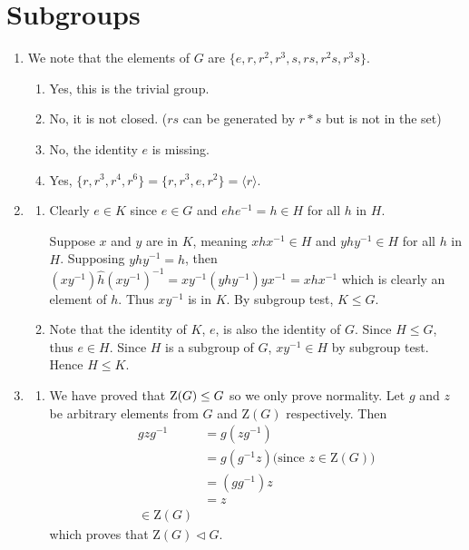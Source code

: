 \section{Subgroups}
\begin{enumerate}
    \item We note that the elements of $G$ are $\{e, r, r^2, r^3, s, rs, r^2s, r^3s\}$.
    \begin{enumerate}[label=(\alph*)]
        \item Yes, this is the trivial group.
        \item No, it is not closed. ($rs$ can be generated by $r \ast s$ but is not in the set)
        \item No, the identity $e$ is missing.
        \item Yes, $\{r, r^3, r^4, r^6\} = \{r, r^3, e, r^2\} = \langle r \rangle$.
    \end{enumerate}

    \item \begin{enumerate}[label=(\alph*)]
        \item Clearly $e \in K$ since $e \in G$ and $ehe^{-1} = h \in H$ for all $h$ in $H$.

        Suppose $x$ and $y$ are in $K$, meaning $xhx^{-1} \in H$ and $yhy^{-1} \in H$ for all $h$ in $H$. Supposing $yhy^{-1} = \hat{h}$, then $(xy^{-1})\hat{h}(xy^{-1})^{-1} = xy^{-1}\left(yhy^{-1}\right)yx^{-1} = xhx^{-1}$ which is clearly an element of $h$. Thus $xy^{-1}$ is in $K$. By subgroup test, $K \leq G$.

        \item Note that the identity of $K$, $e$, is also the identity of $G$. Since $H \leq G$, thus $e \in H$. Since $H$ is a subgroup of $G$, $xy^{-1} \in H$ by subgroup test. Hence $H \leq K$.
    \end{enumerate}

    \item \begin{enumerate}[label=(\alph*)]
        \item We have proved that $\mathrm{Z}(G) \leq G$ so we only prove normality. Let $g$ and $z$ be arbitrary elements from $G$ and $\mathrm{Z}(G)$ respectively. Then
        \begin{align*}
            gzg^{-1} &= g(zg^{-1})\\
            &= g(g^{-1}z) \text{(since }z \in \mathrm{Z}(G))\\
            &= (gg^{-1})z \\
            &= z\\
            \in \mathrm{Z}(G)
        \end{align*}
        which proves that $\mathrm{Z}(G) \lhd G$.


\end{enumerate}
\end{enumerate}
